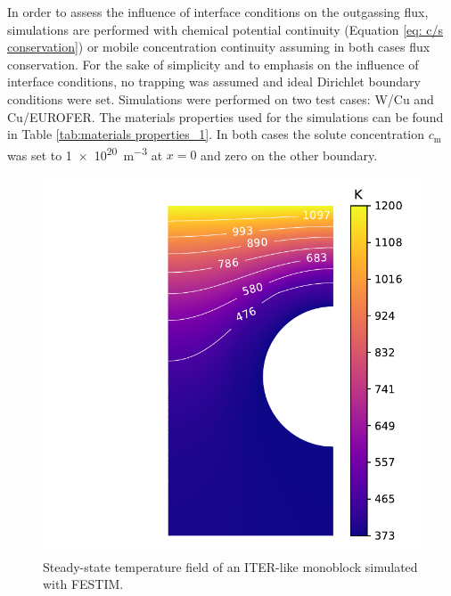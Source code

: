 In order to assess the influence of interface conditions on the outgassing flux, simulations are performed with chemical potential continuity (Equation \ref{eq: c/s conservation}) or mobile concentration continuity assuming in both cases flux conservation.
For the sake of simplicity and to emphasis on the influence of interface conditions, no trapping was assumed and ideal Dirichlet boundary conditions were set.
Simulations were performed on two test cases: W/Cu and Cu/EUROFER.
The materials properties used for the simulations can be found in Table \ref{tab:materials properties_1}.
In both cases the solute concentration $c_\mathrm{m}$ was set to \SI{1e20}{m^{-3}} at $x=0$ and zero on the other boundary.


\begin{figure}
    \centering
    \includegraphics[width=0.8\linewidth]{Figures/Chapter3/monoblocks/interface_condition/iter case/temperature_field_2d.pdf}
    \caption{Steady-state temperature field of an ITER-like monoblock simulated with FESTIM.}
    \label{fig:2D temperature monoblock}
\end{figure}


